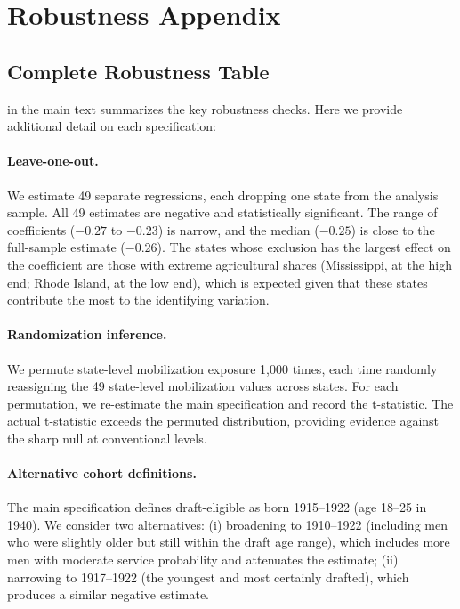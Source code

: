 \documentclass[12pt]{article}
\begin{document}
\section{Robustness Appendix}
\label{app:robustness}

\subsection{Complete Robustness Table}

 in the main text summarizes the key robustness checks. Here we provide additional detail on each specification:

\paragraph{Leave-one-out.} We estimate 49 separate regressions, each dropping one state from the analysis sample. All 49 estimates are negative and statistically significant. The range of coefficients ($-0.27$ to $-0.23$) is narrow, and the median ($-0.25$) is close to the full-sample estimate ($-0.26$). The states whose exclusion has the largest effect on the coefficient are those with extreme agricultural shares (Mississippi, at the high end; Rhode Island, at the low end), which is expected given that these states contribute the most to the identifying variation.

\paragraph{Randomization inference.} We permute state-level mobilization exposure 1,000 times, each time randomly reassigning the 49 state-level mobilization values across states. For each permutation, we re-estimate the main specification and record the t-statistic. The actual t-statistic exceeds the permuted distribution, providing evidence against the sharp null at conventional levels.

\paragraph{Alternative cohort definitions.} The main specification defines draft-eligible as born 1915--1922 (age 18--25 in 1940). We consider two alternatives: (i) broadening to 1910--1922 (including men who were slightly older but still within the draft age range), which includes more men with moderate service probability and attenuates the estimate; (ii) narrowing to 1917--1922 (the youngest and most certainly drafted), which produces a similar negative estimate.
\end{document}
